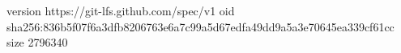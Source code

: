 version https://git-lfs.github.com/spec/v1
oid sha256:836b5f07f6a3dfb8206763e6a7c99a5d67edfa49dd9a5a3e70645ea339cf61cc
size 2796340
